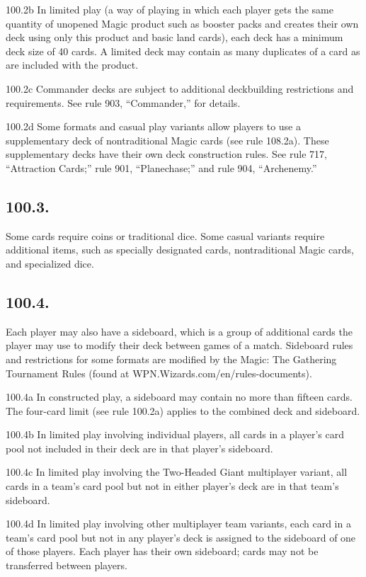 100.2b In limited play (a way of playing in which each player gets the same quantity of unopened Magic product such as booster packs and creates their own deck using only this product and basic land cards), each deck has a minimum deck size of 40 cards. A limited deck may contain as many duplicates of a card as are included with the product.

100.2c Commander decks are subject to additional deckbuilding restrictions and requirements. See rule 903, “Commander,” for details.

100.2d Some formats and casual play variants allow players to use a supplementary deck of nontraditional Magic cards (see rule 108.2a). These supplementary decks have their own deck construction rules. See rule 717, “Attraction Cards;” rule 901, “Planechase;” and rule 904, “Archenemy.”

\subsection*{100.3.}
Some cards require coins or traditional dice. Some casual variants require additional items, such as specially designated cards, nontraditional Magic cards, and specialized dice.

\subsection*{100.4.}
Each player may also have a sideboard, which is a group of additional cards the player may use to modify their deck between games of a match. Sideboard rules and restrictions for some formats are modified by the Magic: The Gathering Tournament Rules (found at WPN.Wizards.com/en/rules-documents).

100.4a In constructed play, a sideboard may contain no more than fifteen cards. The four-card limit (see rule 100.2a) applies to the combined deck and sideboard.

100.4b In limited play involving individual players, all cards in a player’s card pool not included in their deck are in that player’s sideboard.

100.4c In limited play involving the Two-Headed Giant multiplayer variant, all cards in a team’s card pool but not in either player’s deck are in that team’s sideboard.

100.4d In limited play involving other multiplayer team variants, each card in a team’s card pool but not in any player’s deck is assigned to the sideboard of one of those players. Each player has their own sideboard; cards may not be transferred between players.

